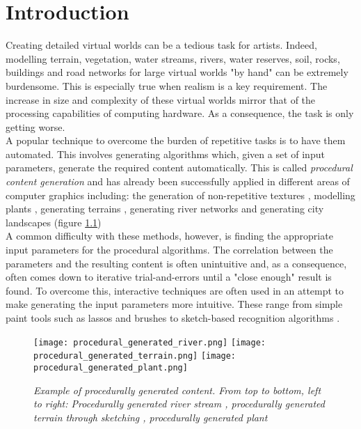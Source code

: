 
\chapter{Introduction}
\par
Creating detailed virtual worlds can be a tedious task for artists. Indeed, modelling terrain, vegetation, water streams, rivers, water reserves, soil, rocks, buildings and road networks for large virtual worlds "by hand" can be extremely burdensome. This is especially true when realism is a key requirement. The increase in size and complexity of these virtual worlds mirror that of the processing capabilities of computing hardware. As a consequence, the task is only getting worse.\\

A popular technique to overcome the burden of repetitive tasks is to have them automated. This involves generating algorithms which, given a set of input parameters, generate the required content automatically. This is called \textit{procedural content generation} and has already been successfully applied in different areas of computer graphics including: the generation of non-repetitive textures \cite{Efros1999,Liang2001,Wei2009}, modelling plants \cite{Boudon2012,Fourcaud2008,Guo2011,Lewis1999}, generating terrains \cite{Smelik2009,Gain2009,Doran2010}, generating river networks \cite{Derzapf2011,Emilien} and generating city landscapes \cite{Gain,Kelly2007,Parish2001} (figure \ref{Example of procedurally generated content}) \\
A common difficulty with these methods, however, is finding the appropriate input parameters for the procedural algorithms. The correlation between the parameters and the resulting content is often unintuitive and, as a consequence, often comes down to iterative trial-and-errors until a "close enough" result is found. To overcome this, interactive techniques are often used in an attempt to make generating the input parameters more intuitive. These range from simple paint tools such as lassos and brushes \cite{Emilien} to sketch-based recognition algorithms \cite{Gain2009}. \\

\begin{figure}[h]
  \centering
	\texttt{[image: procedural\_generated\_river.png]}
	\texttt{[image: procedural\_generated\_terrain.png]}
	\texttt{[image: procedural\_generated\_plant.png]}
	\caption{\textit{Example of procedurally generated content. From top to bottom, left to right: Procedurally generated river stream \cite{Derzapf2011}, procedurally generated terrain through sketching \cite{Gain2009}, procedurally generated plant \cite{Soler2001}}}
	\label{Example of procedurally generated content}
\end{figure}

